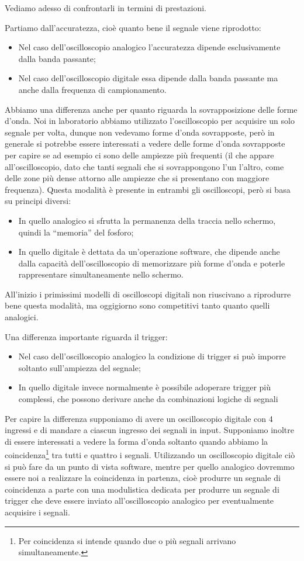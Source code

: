 Vediamo adesso di confrontarli in termini di prestazioni.

Partiamo dall'accuratezza, cioè quanto bene il segnale viene riprodotto:
\begin{itemize}[leftmargin=0.5cm]
   \item Nel caso dell'oscilloscopio analogico l'accuratezza dipende esclusivamente dalla banda passante;
   \item Nel caso dell'oscilloscopio digitale essa dipende dalla banda passante ma anche dalla frequenza di campionamento.
\end{itemize}
Abbiamo una differenza anche per quanto riguarda la sovrapposizione delle forme d'onda. Noi in laboratorio abbiamo utilizzato l'oscilloscopio per acquisire un solo segnale per volta, dunque non vedevamo forme d'onda sovrapposte, però in generale si potrebbe essere interessati a vedere delle forme d'onda sovrapposte per capire se ad esempio ci sono delle ampiezze più frequenti (il che appare all'oscilloscopio, dato che tanti segnali che si sovrappongono l'un l'altro, come delle zone più dense attorno alle ampiezze che si presentano con maggiore frequenza). Questa modalità è presente in entrambi gli oscilloscopi, però si basa su principi diversi:
\begin{itemize}[leftmargin=0.5cm]
   \item In quello analogico si sfrutta la permanenza della traccia nello schermo, quindi la ``memoria'' del fosforo;
   \item In quello digitale è dettata da un'operazione software, che dipende anche dalla capacità dell'oscilloscopio di memorizzare più forme d'onda e poterle rappresentare simultaneamente nello schermo.
\end{itemize}
All'inizio i primissimi modelli di oscilloscopi digitali non riuscivano a riprodurre bene questa modalità, ma oggigiorno sono competitivi tanto quanto quelli analogici.

Una differenza importante riguarda il trigger:
\begin{itemize}[leftmargin=0.5cm]
   \item Nel caso dell'oscilloscopio analogico la condizione di trigger si può imporre soltanto sull'ampiezza del segnale;
   \item In quello digitale invece normalmente è possibile adoperare trigger più complessi, che possono derivare anche da combinazioni logiche di segnali
\end{itemize}
Per capire la differenza supponiamo di avere un oscilloscopio digitale con 4 ingressi e di mandare a ciascun ingresso dei segnali in input. Supponiamo inoltre di essere interessati a vedere la forma d'onda soltanto quando abbiamo la coincidenza\footnote{Per coincidenza si intende quando due o più segnali arrivano simultaneamente.} tra tutti e quattro i segnali. Utilizzando un oscilloscopio digitale ciò si può fare da un punto di vista software, mentre per quello analogico dovremmo essere noi a realizzare la coincidenza in partenza, cioè produrre un segnale di coincidenza a parte con una modulistica dedicata per produrre un segnale di trigger che deve essere inviato all'oscilloscopio analogico per eventualmente acquisire i segnali.

